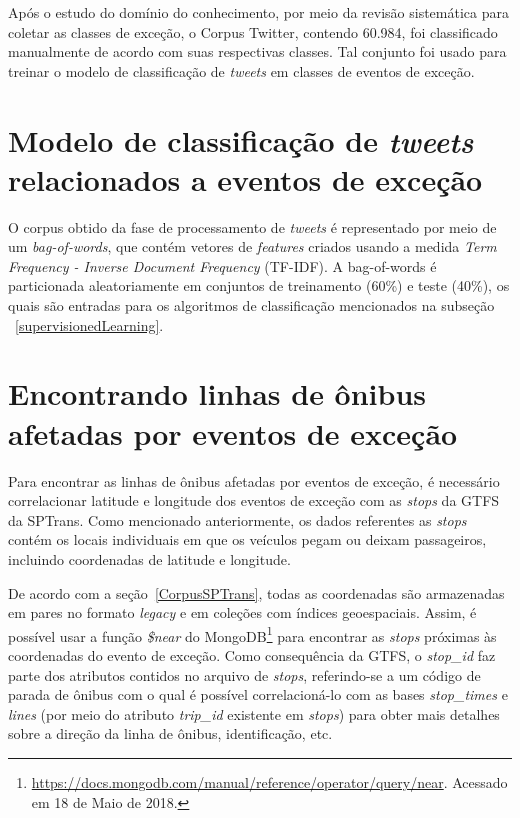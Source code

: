 \documentclass[
	12pt,				%
	oneside,			%
	a4paper,			%
	english,			%
	brazil				%
	]{abntex2ppgsi}
\begin{document}
Após o estudo do domínio do conhecimento, por meio da revisão sistemática para coletar as classes de exceção, o Corpus Twitter, contendo 60.984, foi classificado manualmente de acordo com suas respectivas classes. Tal conjunto foi usado para treinar o modelo de classificação de \textit{tweets} em classes de eventos de exceção. 

\section{Modelo de classificação de \textit{tweets} relacionados a eventos de exceção}
\label{model}

O corpus obtido da fase de processamento de \textit {tweets} é representado por meio de um \textit{bag-of-words}, que contém vetores de \textit{features} criados usando a medida \textit{Term Frequency - Inverse Document Frequency} (TF-IDF). A bag-of-words é particionada aleatoriamente em conjuntos de treinamento (60\%) e teste (40\%), os quais são entradas para os algoritmos de classificação mencionados na subseção ~\ref{supervisionedLearning}.

\section{Encontrando linhas de ônibus afetadas por eventos de exceção}

Para encontrar as linhas de ônibus afetadas por eventos de exceção, é necessário correlacionar latitude e longitude dos eventos de exceção com as \textit{stops} da GTFS da SPTrans. Como mencionado anteriormente, os dados referentes as \textit{stops} contém os locais individuais em que os veículos pegam ou deixam passageiros, incluindo coordenadas de latitude e longitude.

De acordo com a seção~\ref{CorpusSPTrans}, todas as coordenadas são armazenadas em pares no formato \textit{legacy} e em coleções com índices geoespaciais. Assim, é possível usar a função \textit{\$near} do MongoDB\footnote {\url{https://docs.mongodb.com/manual/reference/operator/query/near}. Acessado em 18 de Maio de 2018.} para encontrar as \textit{stops} próximas às coordenadas do evento de exceção. Como consequência da GTFS, o \textit{stop\_id} faz parte dos atributos contidos no arquivo de \textit{stops}, referindo-se a um código de parada de ônibus com o qual é possível correlacioná-lo com as bases \textit{stop\_times} e \textit{lines} (por meio do atributo \textit{trip\_id} existente em \textit{stops}) para obter mais detalhes sobre a direção da linha de ônibus, identificação, etc.
\end{document}
